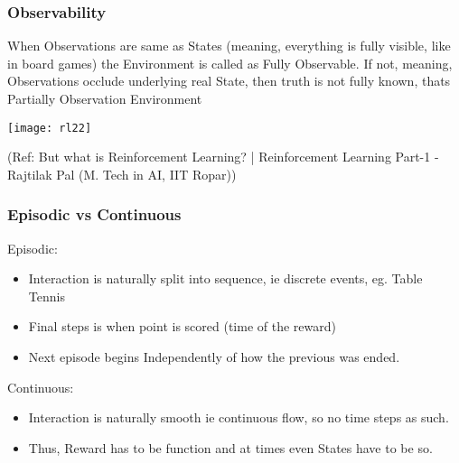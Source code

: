 \begin{frame}[fragile]\frametitle{Observability}
When Observations are same as States (meaning, everything is fully visible, like in board games) the Environment is called as Fully Observable. If not, meaning, Observations occlude underlying real State, then truth is not fully known, thats Partially Observation Environment

\begin{center}
\texttt{[image: rl22]}
\end{center}

{\tiny (Ref: But what is Reinforcement Learning? | Reinforcement Learning Part-1 - Rajtilak Pal (M. Tech in AI, IIT Ropar))}

\end{frame}

\begin{frame}[fragile]\frametitle{Episodic vs Continuous}

Episodic:
\begin{itemize}
\item Interaction is naturally split into sequence, ie discrete events, eg. Table Tennis
\item Final steps is when point is scored (time of the reward)
\item Next episode begins Independently of how the previous was ended.
\end{itemize}

Continuous:
\begin{itemize}
\item Interaction is naturally smooth ie continuous flow, so no time steps as such.
\item Thus, Reward has to be function and at times even States have to be so.
\end{itemize}

\end{frame}



